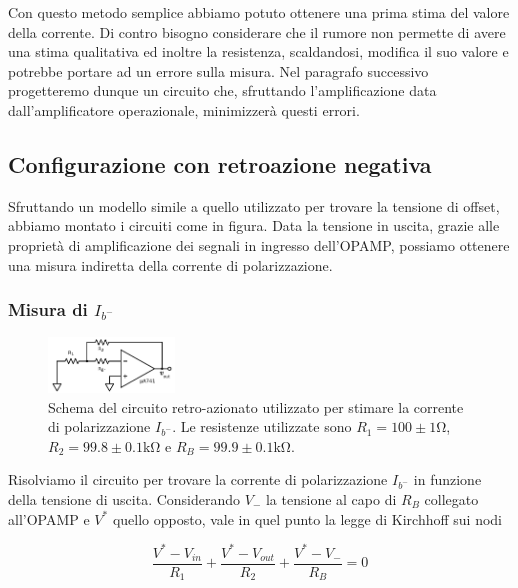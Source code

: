 Con questo metodo semplice abbiamo potuto ottenere una prima stima del valore della corrente. Di contro bisogno considerare che il rumore non permette di avere una stima qualitativa ed inoltre la resistenza, scaldandosi, modifica il suo valore e potrebbe portare ad un errore sulla misura. Nel paragrafo successivo progetteremo dunque un circuito che, sfruttando l'amplificazione data dall'amplificatore operazionale, minimizzerà questi errori.

\subsection{Configurazione con retroazione negativa}

Sfruttando un modello simile a quello utilizzato per trovare la tensione di offset, abbiamo montato i circuiti come in figura. Data la tensione in uscita, grazie alle proprietà di amplificazione dei segnali in ingresso dell'OPAMP, possiamo ottenere una misura indiretta della corrente di polarizzazione.

\subsubsection{Misura di $I_{b^-}$}

\begin{figure}
  \begin{center}
    \includegraphics[width=0.30\textwidth]{../E02/latex/inv_current.pdf}
  \end{center}
  \caption{Schema del circuito retro-azionato utilizzato per stimare la corrente di polarizzazione $I_{b^-}$. Le resistenze utilizzate sono $R_1=100\pm1$\si{\ohm}, $R_2=99.8\pm0.1$\si{\kilo\ohm} e $R_B=99.9\pm0.1$\si{\kilo\ohm}.}
  \label{circuito:rel2_correnti_retroazione_inv}
\end{figure}

Risolviamo il circuito per trovare la corrente di polarizzazione $I_{b^-}$ in funzione della tensione di uscita. Considerando $V_{-}$ la tensione al capo di $R_B$ collegato all'OPAMP e $V^*$ quello opposto, vale in quel punto la legge di Kirchhoff sui nodi

$$\frac{V^* - V_{in}}{R_1} + \frac{V^*-V_{out}}{R_2} + \frac{V^*-V_{-}}{R_B}=0$$

